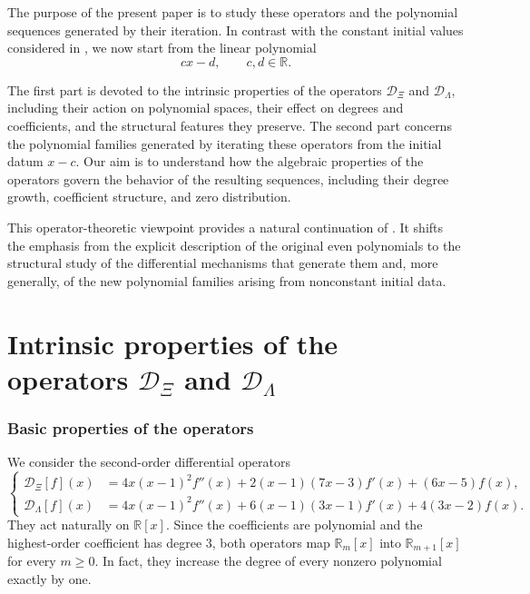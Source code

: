 \documentclass[11pt,twoside]{article}
\numberwithin{equation}{section}
\begin{document}
The purpose of the present paper is to study these operators and the polynomial sequences generated by their iteration. In contrast with the constant initial values considered in \cite{TallaWaffo2026arxiv2602.16761}, we now start from the linear polynomial
\[
cx-d,
\qquad c, d\in\mathbb{R}.
\]

\vspace{0.2cm}

The first part is devoted to the intrinsic properties of the operators \(\mathcal D_{\Xi}\) and \(\mathcal D_{\Lambda}\), including their action on polynomial spaces, their effect on degrees and coefficients, and the structural features they preserve. The second part concerns the polynomial families generated by iterating these operators from the initial datum \(x-c\). Our aim is to understand how the algebraic properties of the operators govern the behavior of the resulting sequences, including their degree growth, coefficient structure, and zero distribution.

\vspace{0.2cm}

This operator-theoretic viewpoint provides a natural continuation of \cite{TallaWaffo2026arxiv2602.16761}. It shifts the emphasis from the explicit description of the original even polynomials to the structural study of the differential mechanisms that generate them and, more generally, of the new polynomial families arising from nonconstant initial data.

\part{Intrinsic properties of the operators \(\mathcal D_{\Xi}\) and \(\mathcal D_{\Lambda}\)}

\section{Basic properties of the operators}

We consider the second-order differential operators
\[
\left\{
\begin{aligned}
\mathcal D_{\Xi}[f](x)
&=
4x(x-1)^2 f''(x)
+2(x-1)(7x-3)f'(x)
+(6x-5)f(x),\\[0.8ex]
\mathcal D_{\Lambda}[f](x)
&=
4x(x-1)^2 f''(x)
+6(x-1)(3x-1)f'(x)
+4(3x-2)f(x).
\end{aligned}
\right.
\]
They act naturally on \(\mathbb R[x]\). Since the coefficients are polynomial and the highest-order coefficient has degree \(3\), both operators map \(\mathbb R_m[x]\) into \(\mathbb R_{m+1}[x]\) for every \(m\ge0\). In fact, they increase the degree of every nonzero polynomial exactly by one.
\end{document}
